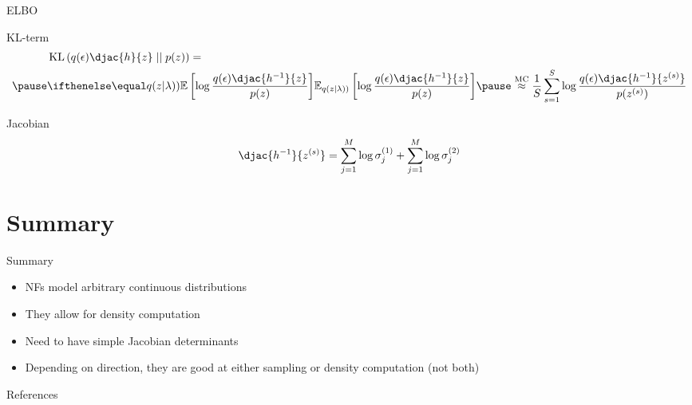 \documentclass[14pt]{beamer}
\begin{document}
\begin{frame}{ELBO}
\begin{small}
\begin{block}{KL-term}
\begin{equation*}
\begin{aligned}
&\KL{q(\epsilon)\djac{h}{z}}{p(z)} = \\ \pause
&\E[q(z|\lambda))]{\log\frac{q(\epsilon)\djac{h^{-1}}{z}}{p(z)}} \pause \overset{\text{MC}}{\approx} \frac{1}{S}\sum_{s=1}^{S} \log\frac{q(\epsilon)\djac{h^{-1}}{z^{(s)}}}{p(z^{(s)})}
\end{aligned}
\end{equation*}
\end{block}
\pause
\begin{block}{Jacobian}
\pause
\begin{equation*}
\djac{h^{-1}}{z^{(s)}} = \sum_{j=1}^{M}\log\sigma^{(1)}_{j} + \sum_{j=1}^{M}\log\sigma^{(2)}_{j}
\end{equation*}
\end{block}
\end{small}
\end{frame}


\section{Summary}

\begin{frame}{Summary}
\begin{itemize}
\item NFs model arbitrary continuous distributions
\item They allow for density computation
\item Need to have simple Jacobian determinants
\item Depending on direction, they are good at either sampling or density computation (not both)
\end{itemize}
\end{frame}

\begin{frame}[allowframebreaks]{References}


\nocite{KingmaEtAl:2016, RezendeMohamed:2015, HuangEtAl:2018}
\end{frame}
\end{document}
